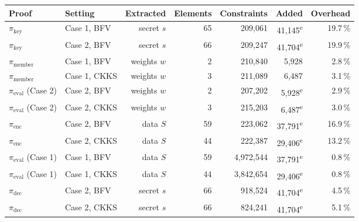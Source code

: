 \begin{tabular}{llrrrrr}
\toprule
Proof & Setting & Extracted & Elements & Constraints & Added & Overhead \\
\midrule
$\pi_{\text{key}}$ & Case 1, BFV & secret $s$ & 65 & 209{,}061 & 41{,}145\textsuperscript{e} & 19.7\,\% \\
$\pi_{\text{key}}$ & Case 2, BFV & secret $s$ & 66 & 209{,}247 & 41{,}704\textsuperscript{e} & 19.9\,\% \\
$\pi_{\text{member}}$ & Case 1, BFV & weights $w$ & 2 & 210{,}840 & 5{,}928 & 2.8\,\% \\
$\pi_{\text{member}}$ & Case 1, CKKS & weights $w$ & 3 & 211{,}089 & 6{,}487 & 3.1\,\% \\
$\pi_{\text{eval}}$ (Case 2) & Case 2, BFV & weights $w$ & 2 & 207{,}202 & 5{,}928\textsuperscript{e} & 2.9\,\% \\
$\pi_{\text{eval}}$ (Case 2) & Case 2, CKKS & weights $w$ & 3 & 215{,}203 & 6{,}487\textsuperscript{e} & 3.0\,\% \\
$\pi_{\text{enc}}$ & Case 2, BFV & data $S$ & 59 & 223{,}062 & 37{,}791\textsuperscript{e} & 16.9\,\% \\
$\pi_{\text{enc}}$ & Case 2, CKKS & data $S$ & 44 & 222{,}387 & 29{,}406\textsuperscript{e} & 13.2\,\% \\
$\pi_{\text{eval}}$ (Case 1) & Case 1, BFV & data $S$ & 59 & 4{,}972{,}544 & 37{,}791\textsuperscript{e} & 0.8\,\% \\
$\pi_{\text{eval}}$ (Case 1) & Case 1, CKKS & data $S$ & 44 & 3{,}842{,}654 & 29{,}406\textsuperscript{e} & 0.8\,\% \\
$\pi_{\text{dec}}$ & Case 2, BFV & secret $s$ & 66 & 918{,}524 & 41{,}704\textsuperscript{e} & 4.5\,\% \\
$\pi_{\text{dec}}$ & Case 2, CKKS & secret $s$ & 66 & 824{,}241 & 41{,}704\textsuperscript{e} & 5.1\,\% \\
\bottomrule
\end{tabular}
